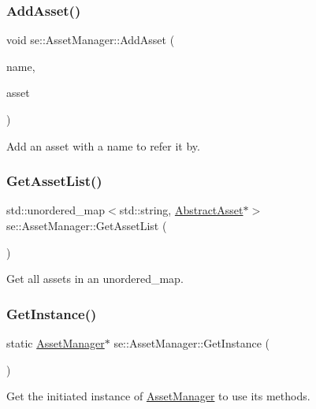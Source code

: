 \subsubsection{\texorpdfstring{Add\+Asset()}{AddAsset()}}
{\footnotesize\ttfamily void se\+::\+Asset\+Manager\+::\+Add\+Asset (\begin{DoxyParamCaption}\item[{const std\+::string \&}]{name,  }\item[{\mbox{\hyperlink{classse_1_1_abstract_asset}{Abstract\+Asset}} $\ast$}]{asset }\end{DoxyParamCaption})}

Add an asset with a name to refer it by. \mbox{\label{classse_1_1_asset_manager_adaa14ad4d80b328f2204543d788c6a28}} 
\subsubsection{\texorpdfstring{Get\+Asset\+List()}{GetAssetList()}}
{\footnotesize\ttfamily std\+::unordered\+\_\+map$<$std\+::string, \mbox{\hyperlink{classse_1_1_abstract_asset}{Abstract\+Asset}}$\ast$$>$ se\+::\+Asset\+Manager\+::\+Get\+Asset\+List (\begin{DoxyParamCaption}{ }\end{DoxyParamCaption})}

Get all assets in an unordered\+\_\+map. \mbox{\label{classse_1_1_asset_manager_abcccad608538c6ddeb223c259089d468}} 
\subsubsection{\texorpdfstring{Get\+Instance()}{GetInstance()}}
{\footnotesize\ttfamily static \mbox{\hyperlink{classse_1_1_asset_manager}{Asset\+Manager}}$\ast$ se\+::\+Asset\+Manager\+::\+Get\+Instance (\begin{DoxyParamCaption}{ }\end{DoxyParamCaption})\hspace{0.3cm}{\ttfamily [static]}}

Get the initiated instance of \mbox{\hyperlink{classse_1_1_asset_manager}{Asset\+Manager}} to use its methods. \mbox{\label{classse_1_1_asset_manager_a3cd3506b7003d63adbd1cd0f94c8931e}} 
